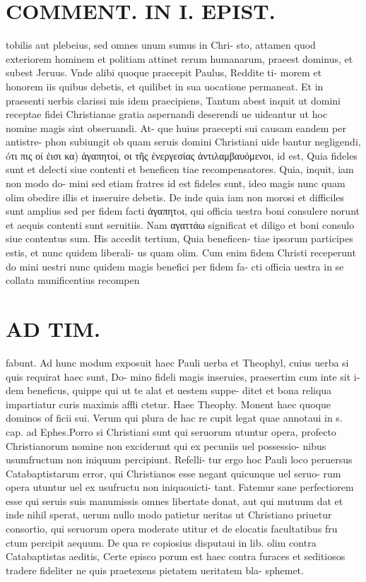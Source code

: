 \documentclass{article}
\begin{document}
\begin{pages}
\section*{COMMENT. IN I. EPIST. }\pstart tobilis aut plebeius, sed omnes unum sumus in Chri- sto, attamen quod exteriorem hominem et politiam attinet rerum humanarum, praeest dominus, et subest Jeruus. Vnde alibi quoque praecepit Paulus, Reddite ti- morem et honorem iis quibus debetis, et quilibet in sua uocatione permaneat. Et in praesenti uerbis clarissi mis idem praecipiens, Tantum abest inquit ut domini receptae fidei Christianae gratia aspernandi deserendi ue uideantur ut hoc nomine magis sint obseruandi. At- que huius praecepti sui causam eandem per antistre- phon subiungit ob quam seruis domini Christiani uide bantur negligendi, óτι πις οί ἐισι κα) ἀγαπητοί, οι τῆς ἐνεργεσίας ἀντιλαμβαυόμενοι, id est, Quia fideles sunt et delecti siue contenti et beneficen tiae recompensatores. Quia, inquit, iam non modo do- mini sed etiam fratres id est fideles sunt, ideo magis nunc quam olim obedire illis et inseruire debetis. De inde quia iam non morosi et difficiles sunt amplius sed per fidem facti ἀγαπητoι, qui officia uestra boni consulere norunt et aequis contenti sunt seruitiis. Nam αγαττάω significat et diligo et boni consulo siue contentus sum. His accedit tertium, Quia beneficen- tiae ipsorum participes estis, et nunc quidem liberali- us quam olim. Cum enim fidem Christi receperunt do mini uestri nunc quidem magis benefici per fidem fa- cti officia uestra in se collata munificentius recompen  \pend
\section*{AD TIM. }
\marginpar{[ p.164 ]}\pstart fabunt. Ad hunc modum exposuit haec Pauli uerba et Theophyl, cuius uerba si quis requirat haec sunt, Do- mino fideli magis inseruies, praesertim cum inte sit i- dem beneficus, quippe qui ut te alat et uestem suppe- ditet et bona reliqua impartiatur curis maximis affli ctetur. Haec Theophy. Monent haec quoque dominos of ficii sui. Verum qui plura de hac re cupit legat quae annotaui in s. cap. ad Ephes.Porro si Christiani sunt qui seruorum utuntur opera, profecto Christianorum nomine non exciderunt qui ex pecuniis uel possessio- nibus usumfructum non iniquum percipiunt. Refelli- tur ergo hoc Pauli loco peruersus Catabaptistarum error, qui Christianos esse negant quicunque uel seruo- rum opera utuntur uel ex usufructu non iniquouicti- tant. Fatemur sane perfectiorem esse qui seruis suis manumissis omnes libertate donat, aut qui mutuum dat et inde nihil sperat, uerum nullo modo patietur ueritas ut Christiano priuetur consortio, qui seruorum opera moderate utitur et de elocatis facultatibus fru ctum percipit aequum. De qua re copiosius disputaui in lib. olim contra Catabaptistas aeditis, Certe episco porum est haec contra furaces et seditiosos tradere fideliter ne quis praetexens pietatem ueritatem bla- sphemet.  \pend
{}
{}

\end{pages}
\end{document}
